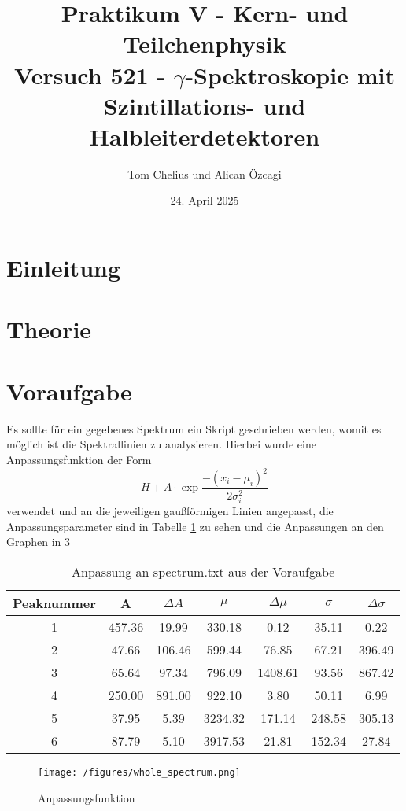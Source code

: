 \documentclass{article}
\title{Praktikum V - Kern- und Teilchenphysik\\Versuch 521 - $\gamma$-Spektroskopie mit Szintillations- und Halbleiterdetektoren}
\author{Tom Chelius und Alican Özcagi}
\date{24. April 2025}
\begin{document}
\maketitle
\tableofcontents

\newpage
\section{Einleitung}

\section{Theorie}

\section{Voraufgabe}
Es sollte für ein gegebenes Spektrum ein Skript geschrieben werden, womit es möglich ist die Spektrallinien zu analysieren. Hierbei wurde eine Anpassungsfunktion der Form
\begin{equation}
    H + A \cdot \exp{\frac{-(x_i-\mu_i )^2}{2 \sigma_i^2}}
\end{equation}
verwendet und an die jeweiligen gaußförmigen Linien angepasst, die Anpassungsparameter sind in Tabelle \ref{tab:voraufgabe} zu sehen und die Anpassungen an den Graphen in \ref{}


\begin{table}
    \centering
    \begin{tabular}{|c|c|c|c|c|c|c|} \hline
      Peaknummer & A & $\Delta A$ & $\mu$ & $\Delta \mu$ & $\sigma$ & $\Delta \sigma$\\ \hline \hline
        1 & 457.36 & 19.99 & 330.18 & 0.12 & 35.11 & 0.22 \\ \hline
        2 & 47.66 & 106.46 & 599.44 & 76.85 & 67.21 & 396.49\\ \hline
        3 & 65.64 & 97.34 &  796.09 & 1408.61 & 93.56 & 867.42\\ \hline
        4 & 250.00 & 891.00 & 922.10 & 3.80 & 50.11 & 6.99\\ \hline
        5 & 37.95 & 5.39 & 3234.32 & 171.14 & 248.58 & 305.13\\ \hline
        6 & 87.79 & 5.10 & 3917.53 & 21.81 & 152.34 & 27.84\\ \hline
    \end{tabular}
    \caption{Anpassung an spectrum.txt aus der Voraufgabe}
    \label{tab:voraufgabe}
\end{table}

\begin{figure}
    \centering
    \texttt{[image: /figures/whole\_spectrum.png]}
    \caption{Anpassungsfunktion}
    \label{fig:voraufgabeFig}
\end{figure}

\newpage
\printbibliography[heading=bibintoc]
\end{document}
